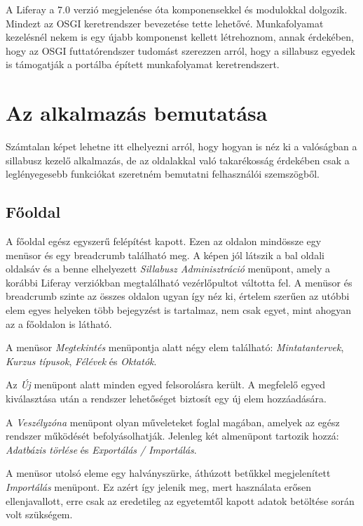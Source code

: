 \documentclass[hidelinks, 12pt, a4paper]{report}
\begin{document}
A Liferay a 7.0 verzió megjelenése óta komponensekkel és modulokkal dolgozik. Mindezt az OSGI keretrendszer bevezetése tette lehetővé. Munkafolyamat kezelésnél nekem is egy újabb komponenst kellett létrehoznom, annak érdekében, hogy az OSGI futtatórendszer tudomást szerezzen arról, hogy a sillabusz egyedek is támogatják a portálba épített munkafolyamat keretrendszert.

\chapter{Az alkalmazás bemutatása}

Számtalan képet lehetne itt elhelyezni arról, hogy hogyan is néz ki a valóságban a sillabusz kezelő alkalmazás, de az oldalakkal való takarékosság érdekében csak a leglényegesebb funkciókat szeretném bemutatni felhasználói szemszögből.

\section{Főoldal}

A főoldal egész egyszerű felépítést kapott. Ezen az oldalon mindössze egy menüsor és egy breadcrumb található meg. A képen jól látszik a bal oldali oldalsáv és a benne elhelyezett \emph{Sillabusz Adminisztráció} menüpont, amely a korábbi Liferay verziókban megtalálható vezérlőpultot váltotta fel. A menüsor és breadcrumb szinte az összes oldalon ugyan így néz ki, értelem szerűen az utóbbi elem egyes helyeken több bejegyzést is tartalmaz, nem csak egyet, mint ahogyan az a főoldalon is látható.

A menüsor \emph{Megtekintés} menüpontja alatt négy elem található: \emph{Mintatantervek}, \emph{Kurzus típusok}, \emph{Félévek} és \emph{Oktatók}.

Az \emph{Új} menüpont alatt minden egyed felsorolásra került. A megfelelő egyed kiválasztása után a rendszer lehetőséget biztosít egy új elem hozzáadására.

A \emph{Veszélyzóna} menüpont olyan műveleteket foglal magában, amelyek az egész rendszer működését befolyásolhatják. Jelenleg két almenüpont tartozik hozzá: \emph{Adatbázis törlése} és \emph{Exportálás / Importálás}.

A menüsor utolsó eleme egy halványszürke, áthúzott betűkkel megjelenített \emph{Importálás} menüpont. Ez azért így jelenik meg, mert használata erősen ellenjavallott, erre csak az eredetileg az egyetemtől kapott adatok betöltése során volt szükségem.
\end{document}
